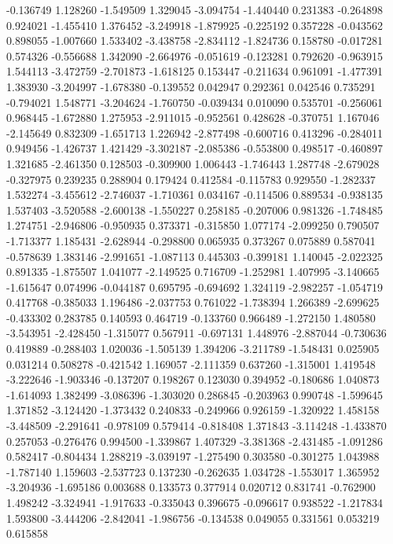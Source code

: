 -0.136749
1.128260
-1.549509
1.329045
-3.094754
-1.440440
0.231383
-0.264898
0.924021
-1.455410
1.376452
-3.249918
-1.879925
-0.225192
0.357228
-0.043562
0.898055
-1.007660
1.533402
-3.438758
-2.834112
-1.824736
0.158780
-0.017281
0.574326
-0.556688
1.342090
-2.664976
-0.051619
-0.123281
0.792620
-0.963915
1.544113
-3.472759
-2.701873
-1.618125
0.153447
-0.211634
0.961091
-1.477391
1.383930
-3.204997
-1.678380
-0.139552
0.042947
0.292361
0.042546
0.735291
-0.794021
1.548771
-3.204624
-1.760750
-0.039434
0.010090
0.535701
-0.256061
0.968445
-1.672880
1.275953
-2.911015
-0.952561
0.428628
-0.370751
1.167046
-2.145649
0.832309
-1.651713
1.226942
-2.877498
-0.600716
0.413296
-0.284011
0.949456
-1.426737
1.421429
-3.302187
-2.085386
-0.553800
0.498517
-0.460897
1.321685
-2.461350
0.128503
-0.309900
1.006443
-1.746443
1.287748
-2.679028
-0.327975
0.239235
0.288904
0.179424
0.412584
-0.115783
0.929550
-1.282337
1.532274
-3.455612
-2.746037
-1.710361
0.034167
-0.114506
0.889534
-0.938135
1.537403
-3.520588
-2.600138
-1.550227
0.258185
-0.207006
0.981326
-1.748485
1.274751
-2.946806
-0.950935
0.373371
-0.315850
1.077174
-2.099250
0.790507
-1.713377
1.185431
-2.628944
-0.298800
0.065935
0.373267
0.075889
0.587041
-0.578639
1.383146
-2.991651
-1.087113
0.445303
-0.399181
1.140045
-2.022325
0.891335
-1.875507
1.041077
-2.149525
0.716709
-1.252981
1.407995
-3.140665
-1.615647
0.074996
-0.044187
0.695795
-0.694692
1.324119
-2.982257
-1.054719
0.417768
-0.385033
1.196486
-2.037753
0.761022
-1.738394
1.266389
-2.699625
-0.433302
0.283785
0.140593
0.464719
-0.133760
0.966489
-1.272150
1.480580
-3.543951
-2.428450
-1.315077
0.567911
-0.697131
1.448976
-2.887044
-0.730636
0.419889
-0.288403
1.020036
-1.505139
1.394206
-3.211789
-1.548431
0.025905
0.031214
0.508278
-0.421542
1.169057
-2.111359
0.637260
-1.315001
1.419548
-3.222646
-1.903346
-0.137207
0.198267
0.123030
0.394952
-0.180686
1.040873
-1.614093
1.382499
-3.086396
-1.303020
0.286845
-0.203963
0.990748
-1.599645
1.371852
-3.124420
-1.373432
0.240833
-0.249966
0.926159
-1.320922
1.458158
-3.448509
-2.291641
-0.978109
0.579414
-0.818408
1.371843
-3.114248
-1.433870
0.257053
-0.276476
0.994500
-1.339867
1.407329
-3.381368
-2.431485
-1.091286
0.582417
-0.804434
1.288219
-3.039197
-1.275490
0.303580
-0.301275
1.043988
-1.787140
1.159603
-2.537723
0.137230
-0.262635
1.034728
-1.553017
1.365952
-3.204936
-1.695186
0.003688
0.133573
0.377914
0.020712
0.831741
-0.762900
1.498242
-3.324941
-1.917633
-0.335043
0.396675
-0.096617
0.938522
-1.217834
1.593800
-3.444206
-2.842041
-1.986756
-0.134538
0.049055
0.331561
0.053219
0.615858

